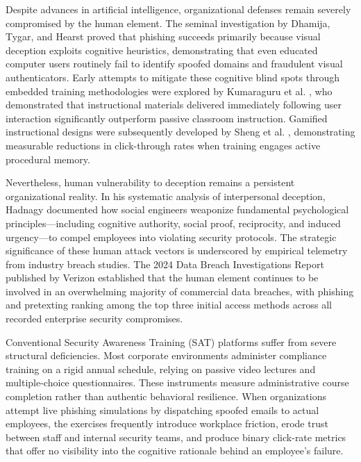 \documentclass[conference,letterpaper]{IEEEtran}
\begin{document}
Despite advances in artificial intelligence, organizational defenses remain severely compromised by the human element. The seminal investigation by Dhamija, Tygar, and Hearst \cite{dhamija2006} proved that phishing succeeds primarily because visual deception exploits cognitive heuristics, demonstrating that even educated computer users routinely fail to identify spoofed domains and fraudulent visual authenticators. Early attempts to mitigate these cognitive blind spots through embedded training methodologies were explored by Kumaraguru et al. \cite{kumaraguru2010}, who demonstrated that instructional materials delivered immediately following user interaction significantly outperform passive classroom instruction. Gamified instructional designs were subsequently developed by Sheng et al. \cite{sheng2007}, demonstrating measurable reductions in click-through rates when training engages active procedural memory.

Nevertheless, human vulnerability to deception remains a persistent organizational reality. In his systematic analysis of interpersonal deception, Hadnagy \cite{hadnagy2018} documented how social engineers weaponize fundamental psychological principles---including cognitive authority, social proof, reciprocity, and induced urgency---to compel employees into violating security protocols. The strategic significance of these human attack vectors is underscored by empirical telemetry from industry breach studies. The 2024 Data Breach Investigations Report published by Verizon \cite{verizon2024} established that the human element continues to be involved in an overwhelming majority of commercial data breaches, with phishing and pretexting ranking among the top three initial access methods across all recorded enterprise security compromises.

Conventional Security Awareness Training (SAT) platforms suffer from severe structural deficiencies. Most corporate environments administer compliance training on a rigid annual schedule, relying on passive video lectures and multiple-choice questionnaires. These instruments measure administrative course completion rather than authentic behavioral resilience. When organizations attempt live phishing simulations by dispatching spoofed emails to actual employees, the exercises frequently introduce workplace friction, erode trust between staff and internal security teams, and produce binary click-rate metrics that offer no visibility into the cognitive rationale behind an employee's failure.
\end{document}
